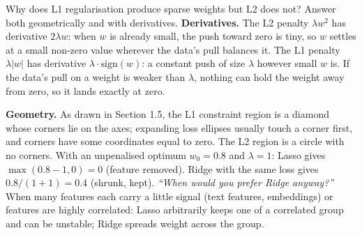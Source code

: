 \begin{qa}{Why does L1 regularisation produce sparse weights but L2 does not? Answer both geometrically and
with derivatives.}
\why
\textbf{Derivatives.} The L2 penalty $\lambda w^2$ has derivative $2\lambda w$: when $w$ is already small, the
push toward zero is tiny, so $w$ settles at a small non-zero value wherever the data's pull balances it. The L1
penalty $\lambda|w|$ has derivative $\lambda\cdot\text{sign}(w)$: a constant push of size $\lambda$ however small
$w$ is. If the data's pull on a weight is weaker than $\lambda$, nothing can hold the weight away from zero, so it
lands exactly at zero.

\textbf{Geometry.} As drawn in Section 1.5, the L1 constraint region is a diamond whose corners lie on the
axes; expanding loss ellipses usually touch a corner first, and corners have some coordinates equal to zero.
The L2 region is a circle with no corners.
\worked With an unpenalised optimum $w_0 = 0.8$ and $\lambda = 1$: Lasso gives $\max(0.8 - 1, 0) = 0$ (feature
removed). Ridge with the same loss gives $0.8/(1+1) = 0.4$ (shrunk, kept).
\pushes \emph{``When would you prefer Ridge anyway?''} When many features each carry a little signal (text
features, embeddings) or features are highly correlated: Lasso arbitrarily keeps one of a correlated group and
can be unstable; Ridge spreads weight across the group.
\end{qa}

